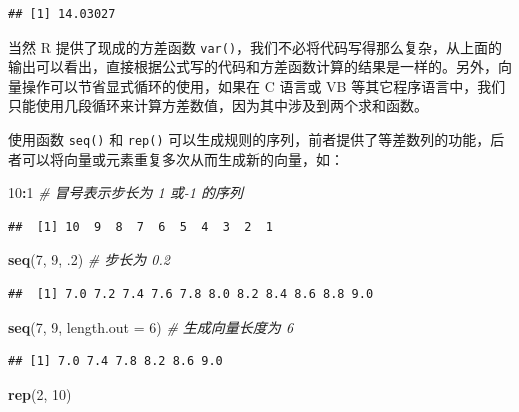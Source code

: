 \documentclass[
  b5paper,
  UTF8,twoside]{book}
\newenvironment{Shaded}{\begin{snugshade}}{\end{snugshade}}
\newcommand{\AttributeTok}[1]{\textcolor[rgb]{0.13,0.29,0.53}{#1}}
\newcommand{\CommentTok}[1]{\textcolor[rgb]{0.56,0.35,0.01}{\textit{#1}}}
\newcommand{\DecValTok}[1]{\textcolor[rgb]{0.00,0.00,0.81}{#1}}
\newcommand{\FunctionTok}[1]{\textcolor[rgb]{0.13,0.29,0.53}{\textbf{#1}}}
\newcommand{\NormalTok}[1]{#1}
\newcommand{\SpecialCharTok}[1]{\textcolor[rgb]{0.81,0.36,0.00}{\textbf{#1}}}
\begin{document}
\begin{verbatim}
## [1] 14.03027
\end{verbatim}

当然 R 提供了现成的方差函数 \texttt{var()}，我们不必将代码写得那么复杂，从上面的输出可以看出，直接根据公式写的代码和方差函数计算的结果是一样的。另外，向量操作可以节省显式循环的使用，如果在 C 语言或 VB 等其它程序语言中，我们只能使用几段循环来计算方差数值，因为其中涉及到两个求和函数。

使用函数 \texttt{seq()} 和 \texttt{rep()} 可以生成规则的序列，前者提供了等差数列的功能，后者可以将向量或元素重复多次从而生成新的向量，如：

\begin{Shaded}
\begin{Highlighting}[]
\DecValTok{10}\SpecialCharTok{:}\DecValTok{1} \CommentTok{\# 冒号表示步长为 1 或{-}1 的序列}
\end{Highlighting}
\end{Shaded}

\begin{verbatim}
##  [1] 10  9  8  7  6  5  4  3  2  1
\end{verbatim}

\begin{Shaded}
\begin{Highlighting}[]
\FunctionTok{seq}\NormalTok{(}\DecValTok{7}\NormalTok{, }\DecValTok{9}\NormalTok{, .}\DecValTok{2}\NormalTok{) }\CommentTok{\# 步长为 0.2}
\end{Highlighting}
\end{Shaded}

\begin{verbatim}
##  [1] 7.0 7.2 7.4 7.6 7.8 8.0 8.2 8.4 8.6 8.8 9.0
\end{verbatim}

\begin{Shaded}
\begin{Highlighting}[]
\FunctionTok{seq}\NormalTok{(}\DecValTok{7}\NormalTok{, }\DecValTok{9}\NormalTok{, }\AttributeTok{length.out =} \DecValTok{6}\NormalTok{) }\CommentTok{\# 生成向量长度为 6}
\end{Highlighting}
\end{Shaded}

\begin{verbatim}
## [1] 7.0 7.4 7.8 8.2 8.6 9.0
\end{verbatim}

\begin{Shaded}
\begin{Highlighting}[]
\FunctionTok{rep}\NormalTok{(}\DecValTok{2}\NormalTok{, }\DecValTok{10}\NormalTok{)}
\end{Highlighting}
\end{Shaded}
\end{document}

